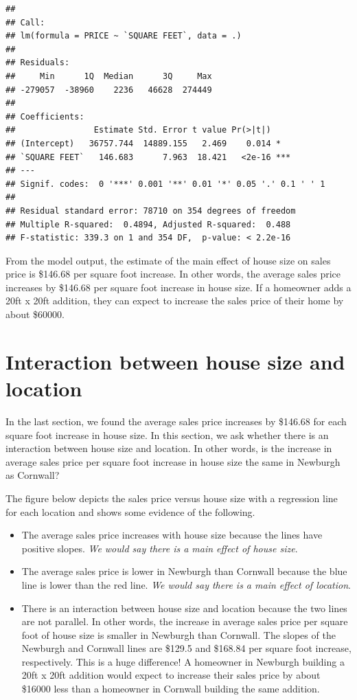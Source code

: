 \documentclass[
]{book}
\begin{document}
\begin{verbatim}
## 
## Call:
## lm(formula = PRICE ~ `SQUARE FEET`, data = .)
## 
## Residuals:
##     Min      1Q  Median      3Q     Max 
## -279057  -38960    2236   46628  274449 
## 
## Coefficients:
##                Estimate Std. Error t value Pr(>|t|)    
## (Intercept)   36757.744  14889.155   2.469    0.014 *  
## `SQUARE FEET`   146.683      7.963  18.421   <2e-16 ***
## ---
## Signif. codes:  0 '***' 0.001 '**' 0.01 '*' 0.05 '.' 0.1 ' ' 1
## 
## Residual standard error: 78710 on 354 degrees of freedom
## Multiple R-squared:  0.4894, Adjusted R-squared:  0.488 
## F-statistic: 339.3 on 1 and 354 DF,  p-value: < 2.2e-16
\end{verbatim}

From the model output, the estimate of the main effect of house size on sales price is \$146.68 per square foot increase. In other words, the average sales price increases by \$146.68 per square foot increase in house size. If a homeowner adds a 20ft x 20ft addition, they can expect to increase the sales price of their home by about \$60000.

\hypertarget{interaction-between-house-size-and-location}{%
\section{Interaction between house size and location}\label{interaction-between-house-size-and-location}}

In the last section, we found the average sales price increases by \$146.68 for each square foot increase in house size. In this section, we ask whether there is an interaction between house size and location. In other words, is the increase in average sales price per square foot increase in house size the same in Newburgh as Cornwall?

The figure below depicts the sales price versus house size with a regression line for each location and shows some evidence of the following.

\begin{itemize}
\item
  The average sales price increases with house size because the lines have positive slopes. \emph{We would say there is a main effect of house size}.
\item
  The average sales price is lower in Newburgh than Cornwall because the blue line is lower than the red line. \emph{We would say there is a main effect of location}.
\item
  There is an interaction between house size and location because the two lines are not parallel. In other words, the increase in average sales price per square foot of house size is smaller in Newburgh than Cornwall. The slopes of the Newburgh and Cornwall lines are \$129.5 and \$168.84 per square foot increase, respectively. This is a huge difference! A homeowner in Newburgh building a 20ft x 20ft addition would expect to increase their sales price by about \$16000 less than a homeowner in Cornwall building the same addition.
\end{itemize}
\end{document}
